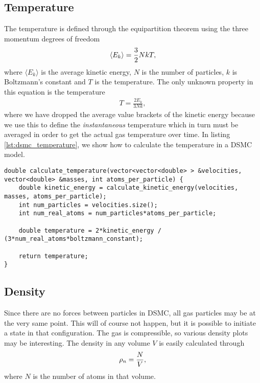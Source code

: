 \subsection{Temperature}
The temperature is defined through the equipartition theorem using the three momentum degrees of freedom
\begin{align}
	\langle E_k \rangle = {3\over 2}NkT,
\end{align}
where $\langle E_k \rangle$ is the average kinetic energy, $N$ is the number of particles, $k$ is Boltzmann's constant and $T$ is the temperature. The only unknown property in this equation is the temperature
\begin{align}
	T = \frac{2E_k}{3Nk},
\end{align}
where we have dropped the average value brackets of the kinetic energy because we use this to define the \textit{instantaneous} temperature which in turn must be averaged in order to get the actual gas temperature over time. In listing \ref{lst:dsmc_temperature}, we show how to calculate the temperature in a DSMC model.

\begin{lstlisting}[caption=Calculation of instantaneous temperature., label=lst:dsmc_temperature]
double calculate_temperature(vector<vector<double> > &velocities, vector<double> &masses, int atoms_per_particle) {
	double kinetic_energy = calculate_kinetic_energy(velocities, masses, atoms_per_particle);
	int num_particles = velocities.size();
	int num_real_atoms = num_particles*atoms_per_particle;
	
	double temperature = 2*kinetic_energy / (3*num_real_atoms*boltzmann_constant);
	
	return temperature;
}
\end{lstlisting}

\subsection{Density}
Since there are no forces between particles in DSMC, all gas particles may be at the very same point. This will of course not happen, but it is possible to initiate a state in that configuration. The gas is compressible, so various density plots may be interesting. The density in any volume $V$ is easily calculated through
\begin{align}
	\rho_n = {N \over V},
\end{align}
where $N$ is the number of atoms in that volume. 

